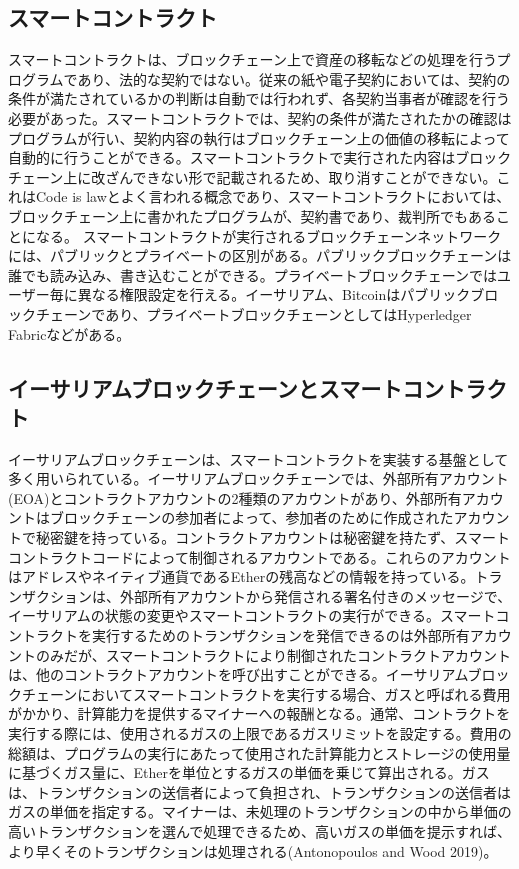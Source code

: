 \documentclass[a4paper,fontsize=11pt,report,notitlepage,line_length=38zw,number_of_lines=40,dvipdfmx]{jlreq}
\begin{document}
\subsection{スマートコントラクト}
スマートコントラクトは、ブロックチェーン上で資産の移転などの処理を行うプログラムであり、法的な契約ではない。従来の紙や電子契約においては、契約の条件が満たされているかの判断は自動では行われず、各契約当事者が確認を行う必要があった。スマートコントラクトでは、契約の条件が満たされたかの確認はプログラムが行い、契約内容の執行はブロックチェーン上の価値の移転によって自動的に行うことができる。スマートコントラクトで実行された内容はブロックチェーン上に改ざんできない形で記載されるため、取り消すことができない。これはCode is lawとよく言われる概念であり、スマートコントラクトにおいては、ブロックチェーン上に書かれたプログラムが、契約書であり、裁判所でもあることになる\cite{nagasawa2013}。
スマートコントラクトが実行されるブロックチェーンネットワークには、パブリックとプライベートの区別がある。パブリックブロックチェーンは誰でも読み込み、書き込むことができる。プライベートブロックチェーンではユーザー毎に異なる権限設定を行える。イーサリアム、Bitcoinはパブリックブロックチェーンであり、プライベートブロックチェーンとしてはHyperledger Fabricなどがある。

\subsection{イーサリアムブロックチェーンとスマートコントラクト}
イーサリアムブロックチェーンは、スマートコントラクトを実装する基盤として多く用いられている。イーサリアムブロックチェーンでは、外部所有アカウント(EOA)とコントラクトアカウントの2種類のアカウントがあり、外部所有アカウントはブロックチェーンの参加者によって、参加者のために作成されたアカウントで秘密鍵を持っている。コントラクトアカウントは秘密鍵を持たず、スマートコントラクトコードによって制御されるアカウントである。これらのアカウントはアドレスやネイティブ通貨であるEtherの残高などの情報を持っている。トランザクションは、外部所有アカウントから発信される署名付きのメッセージで、イーサリアムの状態の変更やスマートコントラクトの実行ができる。スマートコントラクトを実行するためのトランザクションを発信できるのは外部所有アカウントのみだが、スマートコントラクトにより制御されたコントラクトアカウントは、他のコントラクトアカウントを呼び出すことができる。イーサリアムブロックチェーンにおいてスマートコントラクトを実行する場合、ガスと呼ばれる費用がかかり、計算能力を提供するマイナーへの報酬となる。通常、コントラクトを実行する際には、使用されるガスの上限であるガスリミットを設定する。費用の総額は、プログラムの実行にあたって使用された計算能力とストレージの使用量に基づくガス量に、Etherを単位とするガスの単価を乗じて算出される。ガスは、トランザクションの送信者によって負担され、トランザクションの送信者はガスの単価を指定する。マイナーは、未処理のトランザクションの中から単価の高いトランザクションを選んで処理できるため、高いガスの単価を提示すれば、より早くそのトランザクションは処理される(Antonopoulos and Wood 2019)\cite{antonopoulos2019}。
\end{document}
